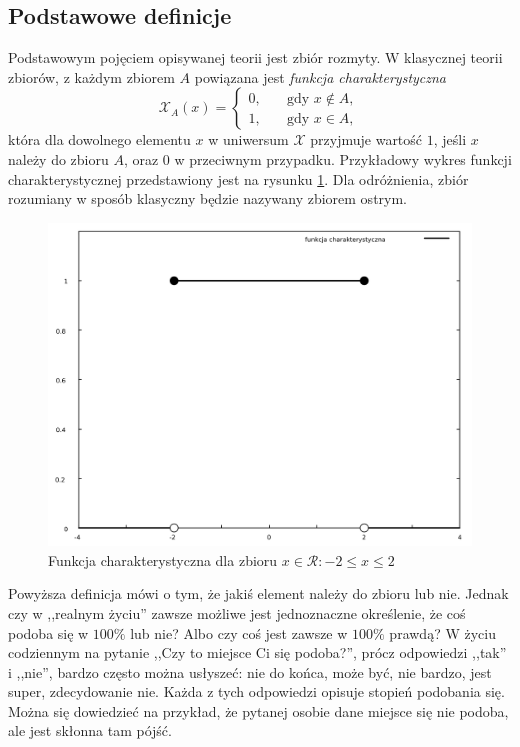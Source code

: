 \subsection{Podstawowe definicje}
Podstawowym pojęciem opisywanej teorii jest zbiór rozmyty. W klasycznej teorii
zbiorów, z każdym zbiorem $A$ powiązana jest \emph{funkcja charakterystyczna}
$$ \mathcal{X}_A(x) = 
  \left\{ 
	\begin{array}{ll}
	0, & \quad \textrm{gdy } x \notin A, \\
	1, & \quad \textrm{gdy } x \in A,
  	\end{array} 
  \right. $$  
która dla dowolnego elementu $x$  w uniwersum $\mathcal{X}$ przyjmuje wartość
$1$, jeśli $x$ należy do zbioru $A$, oraz $0$ w przeciwnym przypadku.
Przykładowy wykres funkcji charakterystycznej przedstawiony jest na rysunku
\ref{fig:funkcja_charakterystyczna}. Dla odróżnienia, zbiór rozumiany w sposób
klasyczny będzie nazywany zbiorem ostrym.

\begin{figure}[ht]
  \includegraphics[width=\linewidth]
  	{chapters/fuzzylogic/funkcja_charakterystyczna}
  \caption{Funkcja charakterystyczna dla zbioru $x \in \mathcal{R} : -2 \leq x
  \leq 2 $}
  \label{fig:funkcja_charakterystyczna}
\end{figure}

Powyższa definicja mówi o tym, że jakiś element należy do zbioru lub nie. Jednak
czy w ,,realnym życiu'' zawsze możliwe jest jednoznaczne określenie, że coś
podoba się w $100\%$ lub nie? Albo czy coś jest zawsze w $100\%$ prawdą? W życiu
codziennym na pytanie ,,Czy to miejsce Ci się podoba?'', prócz odpowiedzi
,,tak'' i ,,nie'', bardzo często można usłyszeć: nie do końca, może być, nie
bardzo, jest super, zdecydowanie nie. Każda z tych odpowiedzi opisuje stopień
podobania się. Można się dowiedzieć na przykład, że pytanej osobie dane miejsce
się nie podoba, ale jest skłonna tam pójść.

